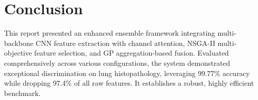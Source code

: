 \documentclass[11pt,a4paper]{article}
\begin{document}
\section{Conclusion}
This report presented an enhanced ensemble framework integrating multi-backbone CNN feature extraction with channel attention, NSGA-II multi-objective feature selection, and GP aggregation-based fusion. Evaluated comprehensively across various configurations, the system demonstrated exceptional discrimination on lung histopathology, leveraging 99.77\% accuracy while dropping 97.4\% of all raw features. It establishes a robust, highly efficient benchmark.


\newpage


\end{document}
